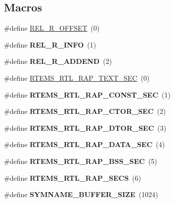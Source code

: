 \subsection*{Macros}
\begin{DoxyCompactItemize}
\item 
\#define \mbox{\hyperlink{rtl-rap_8c_a8809de6f03e511a56892b94bb0ed49dd}{R\+E\+L\+\_\+\+R\+\_\+\+O\+F\+F\+S\+ET}}~(0)
\item 
\mbox{\label{rtl-rap_8c_a439f57647c949873428cde19d81e0216}} 
\#define {\bfseries R\+E\+L\+\_\+\+R\+\_\+\+I\+N\+FO}~(1)
\item 
\mbox{\label{rtl-rap_8c_a032a46e321b9ba0b02ff84228c22679f}} 
\#define {\bfseries R\+E\+L\+\_\+\+R\+\_\+\+A\+D\+D\+E\+ND}~(2)
\item 
\#define \mbox{\hyperlink{rtl-rap_8c_ad56c26e006ac29d4e28ca8c0c9d04cf6}{R\+T\+E\+M\+S\+\_\+\+R\+T\+L\+\_\+\+R\+A\+P\+\_\+\+T\+E\+X\+T\+\_\+\+S\+EC}}~(0)
\item 
\mbox{\label{rtl-rap_8c_a2e6617dc152d720c78ecf24dfe3d37b0}} 
\#define {\bfseries R\+T\+E\+M\+S\+\_\+\+R\+T\+L\+\_\+\+R\+A\+P\+\_\+\+C\+O\+N\+S\+T\+\_\+\+S\+EC}~(1)
\item 
\mbox{\label{rtl-rap_8c_a5946902cb54ecd8b39ff98af9e5d11ab}} 
\#define {\bfseries R\+T\+E\+M\+S\+\_\+\+R\+T\+L\+\_\+\+R\+A\+P\+\_\+\+C\+T\+O\+R\+\_\+\+S\+EC}~(2)
\item 
\mbox{\label{rtl-rap_8c_ad27494b4b1a814a842f06bd36ba06171}} 
\#define {\bfseries R\+T\+E\+M\+S\+\_\+\+R\+T\+L\+\_\+\+R\+A\+P\+\_\+\+D\+T\+O\+R\+\_\+\+S\+EC}~(3)
\item 
\mbox{\label{rtl-rap_8c_adb87b3455426bafe49b2e10a13aff1dd}} 
\#define {\bfseries R\+T\+E\+M\+S\+\_\+\+R\+T\+L\+\_\+\+R\+A\+P\+\_\+\+D\+A\+T\+A\+\_\+\+S\+EC}~(4)
\item 
\mbox{\label{rtl-rap_8c_a28eb51356519fabf757faff395c30297}} 
\#define {\bfseries R\+T\+E\+M\+S\+\_\+\+R\+T\+L\+\_\+\+R\+A\+P\+\_\+\+B\+S\+S\+\_\+\+S\+EC}~(5)
\item 
\mbox{\label{rtl-rap_8c_a2fefdf17f144eb01caff06cedbbf27c1}} 
\#define {\bfseries R\+T\+E\+M\+S\+\_\+\+R\+T\+L\+\_\+\+R\+A\+P\+\_\+\+S\+E\+CS}~(6)
\item 
\mbox{\label{rtl-rap_8c_a3e76f32e8d2d866a739d08021f3c729c}} 
\#define {\bfseries S\+Y\+M\+N\+A\+M\+E\+\_\+\+B\+U\+F\+F\+E\+R\+\_\+\+S\+I\+ZE}~(1024)
\end{DoxyCompactItemize}
